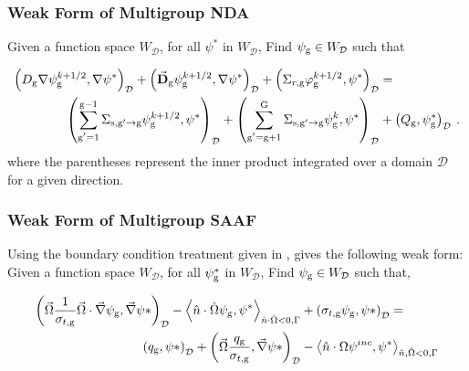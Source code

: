 \subsubsection{Weak Form of Multigroup NDA}

Given a function space $W_\mathcal{D}$, for all $\psi^*$ in $W_\mathcal{D}$, Find $\psi_{\mathrm{g}} \in W_\mathcal{D}$ such that

\begin{equation}
 \begin{split}
  \left(D_{\mathrm{g}} \nabla \psi_{\mathrm{g}}^{k+1/2}, \nabla \psi^*\right)_\mathcal{D} + \left(\vec{\bf{D}}_{\mathrm{g}} \psi_{\mathrm{g}}^{k+1/2} , \nabla \psi^*\right)_\mathcal{D} +  \left(\Sigma_{r,\mathrm{g}} \varphi_{\mathrm{g}}^{k+1/2}, \psi^*\right)_\mathcal{D} &=  \\
   \left(\sum\limits_{\substack{\mathrm{g}'=1}}^{\mathrm{g-1}} \Sigma_{\mathrm{s},\mathrm{g}' \to\mathrm{g}}\psi_{\mathrm{g}}^{k+1/2}, \psi^*\right)_\mathcal{D} + \left(\sum\limits_{\substack{\mathrm{g}'=\mathrm{g}+1}}^{\mathrm{G}} \Sigma_{\mathrm{s},\mathrm{g}' \to\mathrm{g}}\psi_{\mathrm{g}}^{k}, \psi^*\right)_\mathcal{D} 
  &+ \left(Q_{\mathrm{g}}, \psi^*_{\mathrm{g}}\right)_\mathcal{D} \:.
 \end{split}
 \label{k1/2-1g}
\end{equation}
%
where the parentheses represent the inner product integrated over a domain $\mathcal{D}$ for a given direction.

\subsubsection{Weak Form of Multigroup SAAF}
Using the boundary condition treatment given in \cite{zheng-thesis}, gives the following weak form:
Given a function space $W_\mathcal{D}$, for all $\psi^*_{\mathrm{g}}$ in $W_\mathcal{D}$, Find $\psi_{\mathrm{g}} \in W_\mathcal{D}$ such that,

\begin{equation}
    \begin{split}
        \left ( \vec{\Omega}\frac{1}{\sigma_{t, \mathrm{g}}}\vec{\Omega}\cdot \vec{\nabla}\psi_{\mathrm{g}}, \vec{\nabla}\psi* \right)_\mathcal{D} -     \left < \hat{n} \cdot \hat{\Omega}\psi_{\mathrm{g}}, \psi^* \right>_{\hat{n} \cdot \hat{\Omega} < 0, \Gamma} &+ \left ( \sigma_{t, \mathrm{g}} \psi_{\mathrm{g}}, \psi* \right )_\mathcal{D} = \\
        \left ( q_{\mathrm{g}}, \psi* \right)_\mathcal{D} + \left ( \vec{\Omega} \frac{q_{\mathrm{g}}}{\sigma_{t, \mathrm{g}}}, \vec{\nabla}\psi* \right)_\mathcal{D} &- \left < \hat{n} \cdot {\Omega} \psi^{inc}, \psi^* \right>_{\hat{n}, \hat{\Omega} <0, \Gamma} 
    \end{split}
\end{equation}

